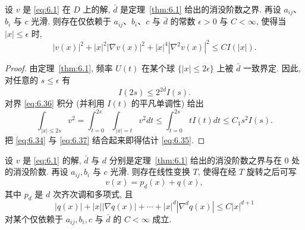 \begin{corollary}
\label{cor:6.11}
设 $v$ 是 \eqref{eq:6.1} 在 $D$ 上的解, $\bar{d}$ 是定理~\ref{thm:6.1}
给出的消没阶数之界. 再设 $a_{ij}$、$b_i$ 与 $c$ 光滑. 则存在仅依赖于
$a_{ij}$、$b_i$、$c$ 与 $\bar{d}$ 的常数 $\epsilon>0$ 与 $C<\infty$,
使得当 $|x|\leq\epsilon$ 时,
\begin{equation}
|v(x)|^2+|x|^2|\nabla v(x)|^2+|x|^4|\nabla^2v(x)|^2\leq CI(|x|).
\label{eq:6.35}
\end{equation}
\end{corollary}

\begin{proof}
由定理~\ref{thm:6.1}, 频率 $U(t)$ 在某个球 $\{|x|\leq2\epsilon\}$ 上被
$\bar{d}$ 一致界定. 因此, 对任意的 $s\leq\epsilon$ 有
\begin{equation}
I(2s)\leq2^{2\bar{d}}I(s).
\label{eq:6.36}
\end{equation}
对界 \eqref{eq:6.36} 积分 (并利用 $I(t)$ 的平凡单调性) 给出
\begin{equation}
\int_{|x|\leq2s}v^2=\int_{t=0}^{2s}\int_{|x|=t}v^2dt
\leq\int_{t=0}^{2s}tI(t)dt\leq C_1s^2I(s).
\label{eq:6.37}
\end{equation}
把 \eqref{eq:6.34} 与 \eqref{eq:6.37} 结合起来即得估计 \eqref{eq:6.35}.
\end{proof}

\begin{theorem}
\label{thm:6.12}
设 $v$ 是 \eqref{eq:6.1} 的解, $\bar{d}$ 与 $d$ 分别是定理~\ref{thm:6.1}
给出的消没阶数之界与在 $0$ 处的消没阶数. 再设 $a_{ij},b_i$ 与 $c$
光滑. 则存在线性变换 $T$, 使得在经 $T$ 旋转之后可写
\begin{equation}
v(x)=p_d(x)+q(x),
\label{eq:6.38}
\end{equation}
其中 $p_d$ 是 $d$ 次齐次调和多项式, 且
\begin{equation}
|q(x)|+|x||\nabla q(x)|+\cdots+|x|^d|\nabla^dq(x)|\leq C|x|^{d+1}
\label{eq:6.39}
\end{equation}
对某个仅依赖于 $a_{ij},b_i,c$ 与 $\bar{d}$ 的 $C<\infty$ 成立.
\end{theorem}

